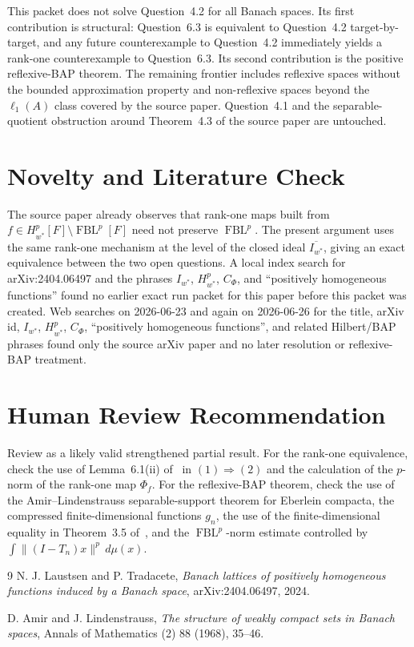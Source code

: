 \documentclass[11pt]{article}
\newcommand{\FBL}{\operatorname{FBL}}
\begin{document}
This packet does not solve Question~4.2 for all Banach spaces.  Its first contribution is
structural: Question~6.3 is equivalent to Question~4.2 target-by-target, and any future
counterexample to Question~4.2 immediately yields a rank-one counterexample to Question~6.3.  Its
second contribution is the positive reflexive-BAP theorem.  The remaining frontier includes
reflexive spaces without the bounded approximation property and non-reflexive spaces beyond the
\(\ell_1(A)\) class covered by the source paper.  Question~4.1 and the separable-quotient
obstruction around Theorem~4.3 of the source paper are untouched.

\section*{Novelty and Literature Check}

The source paper already observes that rank-one maps built from
\(f\in H_{w^*}^p[F]\setminus\FBL^p[F]\) need not preserve \(\FBL^p\).  The present argument uses the
same rank-one mechanism at the level of the closed ideal \(\overline{I_{w^*}}\), giving an exact
equivalence between the two open questions.  A local index search for arXiv:2404.06497 and the
phrases \(I_{w^*}\), \(H_{w^*}^p\), \(C_\Phi\), and ``positively homogeneous functions'' found no
earlier exact run packet for this paper before this packet was created.  Web searches on
2026-06-23 and again on 2026-06-26 for the title, arXiv id, \(I_{w^*}\), \(H_{w^*}^p\),
\(C_\Phi\), ``positively homogeneous functions'', and related Hilbert/BAP phrases found only the
source arXiv paper and no later resolution or reflexive-BAP treatment.

\section*{Human Review Recommendation}

Review as a likely valid strengthened partial result.  For the rank-one equivalence, check the use
of Lemma~6.1(ii) of~\cite{LT} in \((1)\Rightarrow(2)\) and the calculation of the \(p\)-norm of the
rank-one map \(\Phi_f\).  For the reflexive-BAP theorem, check the use of the
Amir--Lindenstrauss separable-support theorem for Eberlein compacta, the compressed
finite-dimensional functions \(g_n\), the use of the finite-dimensional equality in
Theorem~3.5 of~\cite{LT}, and
the \(\FBL^p\)-norm estimate controlled by
\(\int\|(I-T_n)x\|^p\,d\mu(x)\).

\begin{thebibliography}{9}
N. J. Laustsen and P. Tradacete,
\emph{Banach lattices of positively homogeneous functions induced by a Banach space},
arXiv:2404.06497, 2024.

D. Amir and J. Lindenstrauss,
\emph{The structure of weakly compact sets in Banach spaces},
Annals of Mathematics (2) 88 (1968), 35--46.
\end{thebibliography}
\end{document}
